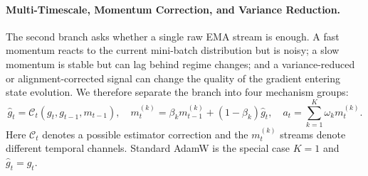 \paragraph{Multi-Timescale, Momentum Correction, and Variance Reduction.}
\label{sec:t1-multitimescale}

The second branch asks whether a single raw EMA stream is enough.  A fast
momentum reacts to the current mini-batch distribution but is noisy; a slow
momentum is stable but can lag behind regime changes; and a variance-reduced
or alignment-corrected signal can change the quality of the gradient entering
state evolution.  We therefore separate the branch into four mechanism groups:
\begin{equation}
  \widehat{g}_t = \mathcal{C}_t(g_t,g_{t-1},m_{t-1}), \quad
  m_t^{(k)} = \beta_k m_{t-1}^{(k)} + (1-\beta_k)\widehat{g}_t,\quad
  a_t = \sum_{k=1}^{K}\omega_k m_t^{(k)}.
  \label{eq:t1-temporal-template}
\end{equation}
Here $\mathcal{C}_t$ denotes a possible estimator correction and the
$m_t^{(k)}$ streams denote different temporal channels.  Standard AdamW is
the special case $K=1$ and $\widehat{g}_t=g_t$.

